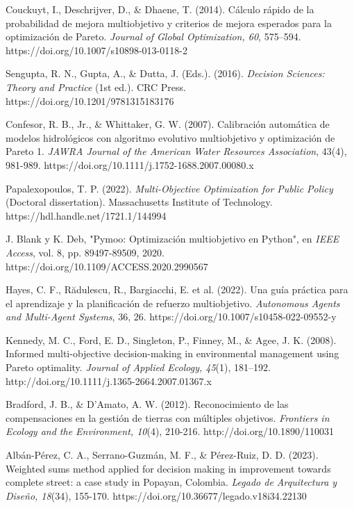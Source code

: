 \documentclass[12pt]{article}
\begin{document}
\begin{thebibliography}{99}
	
	Couckuyt, I., Deschrijver, D., \& Dhaene, T. (2014). Cálculo rápido de la probabilidad de mejora multiobjetivo y criterios de mejora esperados para la optimización de Pareto. \textit{Journal of Global Optimization, 60}, 575–594. https://doi.org/10.1007/s10898-013-0118-2
	
	Sengupta, R. N., Gupta, A., \& Dutta, J. (Eds.). (2016). \textit{Decision Sciences: Theory and Practice} (1st ed.). CRC Press. https://doi.org/10.1201/9781315183176
	
	Confesor, R. B., Jr., \& Whittaker, G. W. (2007). Calibración automática de modelos hidrológicos con algoritmo evolutivo multiobjetivo y optimización de Pareto 1. \textit{JAWRA Journal of the American Water Resources Association}, 43(4), 981-989. 
	https://doi.org/10.1111/j.1752-1688.2007.00080.x
	
	Papalexopoulos, T. P. (2022). \textit{Multi-Objective Optimization for Public Policy} (Doctoral dissertation). Massachusetts Institute of Technology. https://hdl.handle.net/1721.1/144994
	
	J. Blank y K. Deb, "Pymoo: Optimización multiobjetivo en Python", en \textit{IEEE Access}, vol. 8, pp. 89497-89509, 2020.
	https://doi.org/10.1109/ACCESS.2020.2990567
	
	Hayes, C. F., Rădulescu, R., Bargiacchi, E. et al. (2022). Una guía práctica para el aprendizaje y la planificación de refuerzo multiobjetivo. \textit{Autonomous Agents and Multi-Agent Systems}, 36, 26. https://doi.org/10.1007/s10458-022-09552-y
	
	Kennedy, M. C., Ford, E. D., Singleton, P., Finney, M., \& Agee, J. K. (2008). Informed multi-objective decision-making in environmental management using Pareto optimality. \textit{Journal of Applied Ecology, 45}(1), 181–192. http://doi.org/10.1111/j.1365-2664.2007.01367.x
	
	Bradford, J. B., \& D'Amato, A. W. (2012). Reconocimiento de las compensaciones en la gestión de tierras con múltiples objetivos. \textit{Frontiers in Ecology and the Environment, 10}(4), 210-216. http://doi.org/10.1890/110031
	
	Albán-Pérez, C. A., Serrano-Guzmán, M. F., \& Pérez-Ruiz, D. D. (2023). Weighted sums method applied for decision making in improvement towards complete street: a case study in Popayan, Colombia. \textit{Legado de Arquitectura y Diseño, 18}(34), 155-170. https://doi.org/10.36677/legado.v18i34.22130
	

\end{thebibliography}
\end{document}
